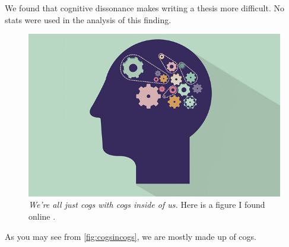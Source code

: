 
We found that cognitive dissonance makes writing a thesis more difficult. No stats were used in the analysis of this finding.
\begin{figure}[H]
  \centering
  \includegraphics[width=.6\textwidth]{cognition/figures/CD.jpg}
  \caption[We're all just cogs with cogs inside of us]
  {\textit{We're all just cogs with cogs inside of us.} Here is a figure I found online \citep{CogDevUCB}.}
  \label{fig:cogsincogs}
\end{figure}

As you may see from \autoref{fig:cogsincogs}, we are mostly made up of cogs.
